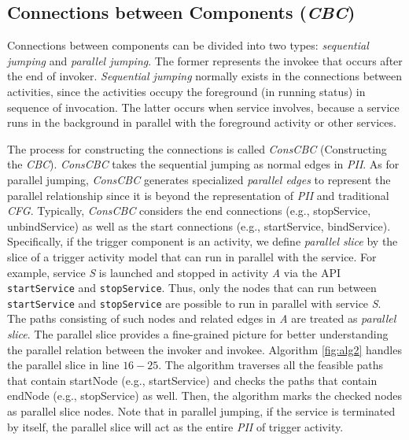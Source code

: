 \subsection{Connections between Components (\textit{CBC})}
Connections between components can be divided into two types: \textit{sequential jumping} and \textit{parallel jumping}. The former represents the invokee that occurs after the end of invoker. \textit{Sequential jumping} normally exists in the connections between activities, since the activities occupy the foreground (in running status) in sequence of invocation. The latter occurs when service involves, because a service runs in the background in parallel with the foreground activity or other services.

The process for constructing the connections is called \textit{ConsCBC} (Constructing the \textit{CBC}). \textit{ConsCBC} takes the sequential jumping as normal edges in \textit{PII}. As for parallel jumping, \textit{ConsCBC} generates specialized \textit{parallel edges} to represent the parallel relationship since it is beyond the representation of \textit{PII} and traditional \textit{CFG}. Typically, \textit{ConsCBC} considers the end connections (e.g., stopService, unbindService) as well as the start connections (e.g., startService, bindService). Specifically, if the trigger component is an activity, we define \textit{parallel slice} by the slice of a trigger activity model that can run in parallel with the service. For example, service \textit{S} is launched and stopped in activity \textit{A} via the API \texttt{startService} and \texttt{stopService}. Thus, only the nodes that can run between \texttt{startService} and \texttt{stopService} are possible to run in parallel with service \textit{S}. The paths consisting of such nodes and related edges in \textit{A} are treated as \textit{parallel slice}. The parallel slice provides a fine-grained picture for better understanding the parallel relation between the invoker and invokee. Algorithm \ref{fig:alg2} handles the parallel slice in line $16-25$. The algorithm traverses all the feasible paths that contain startNode (e.g., startService) and checks the paths that contain endNode (e.g., stopService) as well. Then, the algorithm marks the checked nodes as parallel slice nodes. Note that in parallel jumping, if the service is terminated by itself, the parallel slice will act as the entire \textit{PII} of trigger activity.

